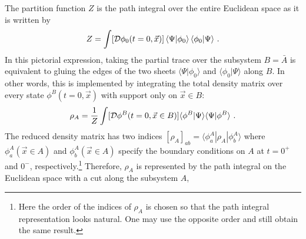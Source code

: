 %
The partition function $Z$ is the path integral over the entire Euclidean space as it is written by
\begin{align}
	Z = \int [{\cal D} \phi_0(t=0, \vec x)]\, \langle \Psi | \phi_0 \rangle \,\langle\phi_0| \Psi\rangle \ .
\end{align}
In this pictorial expression, taking the partial trace over the subsystem $B=\bar A$ is equivalent to gluing the edges of the two sheets $\langle\Psi|\phi_0\rangle$ and $\langle \phi_0 |\Psi\rangle$ along $B$.
%
In other words, this is implemented by integrating the total density matrix over every state $\phi^B(t=0,\vec{x})$ with support only on $\vec{x}\in B$: 
\begin{align}
\rho_A = \frac{1}{Z} \int [{\cal D} \phi^B(t=0, \vec{x}\in B)] \langle \phi^B| \Psi \rangle \langle \Psi | \phi^B\rangle \ .
\end{align}
The reduced density matrix has two indices $[\rho_A]_{ab} = \langle \phi_a^A |\rho_A |\phi_b^A\rangle$ where $\phi_a^A(\vec{x}\in A)$ and $\phi_b^A(\vec{x}\in A)$ specify the boundary conditions on $A$ at $t=0^+$ and $0^-$, respectively.\footnote{Here the order of the indices of $\rho_A$ is chosen so that the path integral representation looks natural. One may use the opposite order and still obtain the same result.}
Therefore, $\rho_A$ is represented by the path integral on the Euclidean space with a cut along the subsystem $A$,
